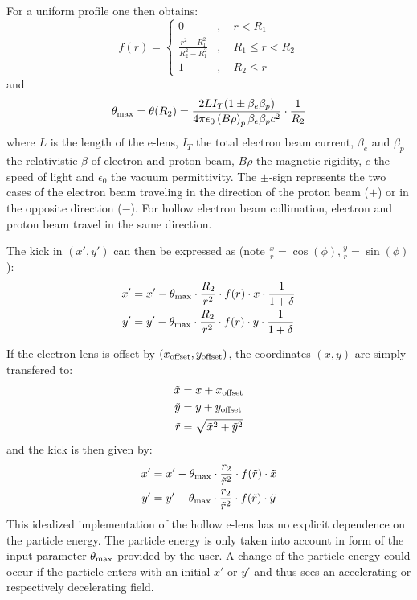 \documentclass[english]{article}
\begin{document}
For a uniform profile one then obtains:
\begin{equation}
f(r) =
\begin{cases} 0 &,\quad r< R_1\\
\frac{r^2-R_1^2}{R_2^2-R_1^2} &,\quad R_1 \leq r < R_2\\
1 &,\quad R_2 \leq r
\end{cases}
\end{equation}
and
\begin{equation}
\theta_{\rm max} = \theta(R_2) = \frac{2LI_T(1\pm\beta_e\beta_p)}{4\pi\epsilon_0  \left(B\rho\right)_p\beta_e\beta_p c^2}\cdot\frac{1}{R_2}
\end{equation}
where $L$ is the length of the e-lens, $I_T$ the total electron beam current, $\beta_{e}$ and $\beta_{p}$ the relativistic $\beta$ of electron and proton beam, $B\rho$ the magnetic rigidity, $c$ the speed of light and $\epsilon_0$ the vacuum permittivity. The $\pm$-sign represents the two cases of the electron beam traveling in the direction of the proton beam ($+$) or in the opposite direction ($-$). For hollow electron beam collimation, electron and proton beam travel in the same direction.

The kick in $(x',y')$ can then be expressed as (note $\frac{x}{r}=\cos(\phi),\frac{y}{r}=\sin(\phi)$):
\begin{align}
x'&=x'-\theta_{\rm max}\cdot\frac{R_2}{r^2}\cdot f(r)\cdot x \cdot \frac{1}{1+\delta}\\
y'&=y'-\theta_{\rm max}\cdot\frac{R_2}{r^2}\cdot f(r)\cdot y \cdot \frac{1}{1+\delta}
\end{align}

If the electron lens is offset by $(x_{\rm offset},y_{\rm offset})$, the coordinates $(x,y)$ are simply transfered to:
\begin{align}
\tilde x&=x+x_{\rm offset}\\
\tilde y&=y+y_{\rm offset}\\
\tilde r&=\sqrt{\tilde x^2+\tilde y^2}
\end{align}
and the kick is then given by:
\begin{align}
x'&=x'-\theta_{\rm max}\cdot\frac{r_2}{\tilde r^2}\cdot f(\tilde r)\cdot \tilde x\\
y'&=y'-\theta_{\rm max}\cdot\frac{r_2}{\tilde r^2}\cdot f(\tilde r)\cdot \tilde y
\end{align}
This idealized implementation of the hollow e-lens has no explicit dependence on the particle energy. The particle energy is only taken into account in form of the input parameter $\theta_{\rm max}$ provided by the user. A change of the particle energy could occur if the particle enters with an initial $x'$ or $y'$ and thus sees an accelerating or respectively decelerating field.
\end{document}
